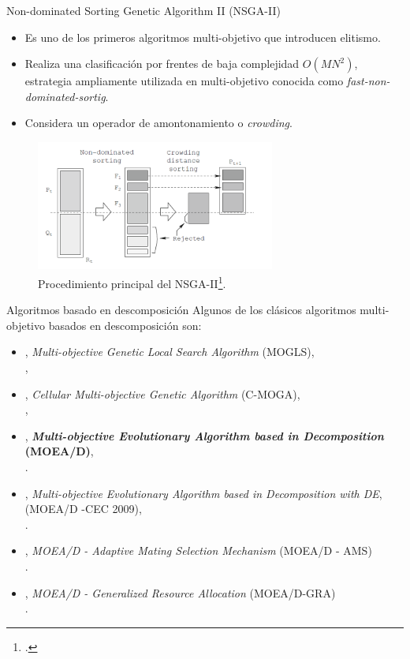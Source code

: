 \documentclass{beamer}
\begin{document}
\begin{frame}{Non-dominated Sorting Genetic Algorithm II (NSGA-II)}
\begin{itemize}
\scriptsize
\item Es uno de los primeros algoritmos multi-objetivo que introducen elitismo.
\item Realiza una clasificación por frentes de baja complejidad $O(MN^2)$, estrategia ampliamente utilizada en multi-objetivo conocida como \textit{fast-non-dominated-sortig}.
\item Considera un operador de amontonamiento o \textit{crowding}. 
\end{itemize}

\begin{figure}[H]
\centering
\includegraphics[width=0.7\textwidth]{nsgaii_main.png}
\caption{\scriptsize Procedimiento principal del NSGA-II\footcite{Joel:NSGAII}.}
\end{figure}
\end{frame}

 
\begin{frame}{Algoritmos basado en descomposición}
Algunos de los clásicos algoritmos multi-objetivo basados en descomposición son:
\begin{itemize}
     \scriptsize
    \item \citeyear{ishibuchi1998multi}, \textit{Multi-objective Genetic Local Search Algorithm} (MOGLS), \\ \citeauthor{ishibuchi1998multi},
    \item \citeyear{murata2002cellular}, \textit{Cellular Multi-objective Genetic Algorithm} (C-MOGA), \\ \citeauthor{murata2002cellular}, 
    \item \citeyear{Joel:MOEAD}, \textbf{\textit{Multi-objective Evolutionary Algorithm based in Decomposition} (MOEA/D)}, \\ \citeauthor{Joel:MOEAD}.
     \item \citeyear{li2009multiobjective}, \textit{Multi-objective Evolutionary Algorithm based in Decomposition with DE}, (MOEA/D -CEC 2009), \\ \citeauthor{li2009multiobjective}.
    \item \citeyear{Joel:MOEAD_AMS}, \textit{MOEA/D - Adaptive Mating Selection Mechanism} (MOEA/D - AMS) \\ \citeauthor{Joel:MOEAD_AMS}.
    \item \citeyear{zhou2015all}, \textit{MOEA/D - Generalized Resource Allocation} (MOEA/D-GRA) \\ \citeauthor{zhou2015all}.
\end{itemize}
\end{frame}
\end{document}
